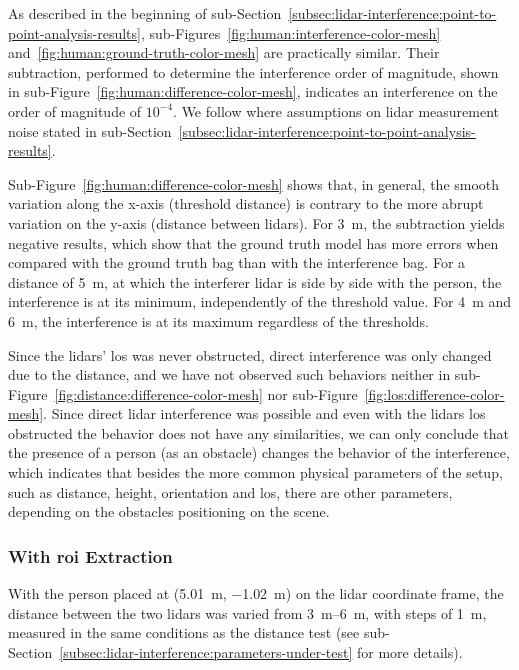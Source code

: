 As described in the beginning of sub-Section~\ref{subsec:lidar-interference:point-to-point-analysis-results}, sub-Figures~\ref{fig:human:interference-color-mesh} and~\ref{fig:human:ground-truth-color-mesh} are practically similar. Their subtraction, performed to determine the interference order of magnitude, shown in sub-Figure~\ref{fig:human:difference-color-mesh}, indicates an interference on the order of magnitude of $10^{-4}$. We follow where assumptions on \ac{lidar} measurement noise stated in sub-Section~\ref{subsec:lidar-interference:point-to-point-analysis-results}.

Sub-Figure~\ref{fig:human:difference-color-mesh} shows that, in general, the smooth variation along the x-axis (threshold distance) is contrary to the more abrupt variation on the y-axis (distance between \acp{lidar}). For \SI{3}{\meter}, the subtraction yields negative results, which show that the ground truth model has more errors when compared with the ground truth bag than with the interference bag. For a distance of \SI{5}{\meter}, at which the interferer \ac{lidar} is side by side with the person, the interference is at its minimum, independently of the threshold value. For \SI{4}{\meter} and \SI{6}{\meter}, the interference is at its maximum regardless of the thresholds. 

Since the \acp{lidar}' \ac{los} was never obstructed, direct interference was only changed due to the distance, and we have not observed such behaviors neither in sub-Figure~\ref{fig:distance:difference-color-mesh} nor sub-Figure~\ref{fig:los:difference-color-mesh}. Since direct  \ac{lidar} interference was possible and even with the \acp{lidar} \ac{los} obstructed the behavior does not have any similarities, we can only conclude that the presence of a person (as an obstacle) changes the behavior of the interference, which indicates that besides the more common physical parameters of the setup, such as distance, height, orientation and \ac{los}, there are other parameters, depending on the obstacles positioning on the scene.


\subsubsection{With \ac{roi} Extraction}
With the person placed at (\SI{5.01}{\meter}, \SI{-1.02}{\meter}) on the \ac{lidar} coordinate frame, the distance between the two \acp{lidar} was varied from \SIrange{3}{6}{\meter}, with steps of \SI{1}{\meter}, measured in the same conditions as the distance test (see sub-Section~\ref{subsec:lidar-interference:parameters-under-test} for more details).

